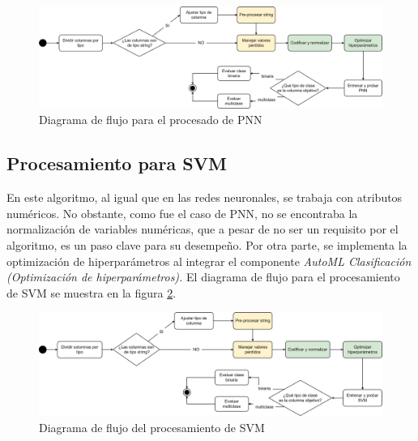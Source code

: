 \begin{figure}[H]
	\centering
	\includegraphics[width=1\linewidth]{"figuras/capi 2/modelos/procesado pnn.drawio"}
	\caption{Diagrama de flujo para el procesado de PNN}
	\label{fig:procesado-pnn}
\end{figure}


\subsection{Procesamiento para SVM}
En este algoritmo, al igual que en las redes neuronales, se trabaja con atributos numéricos. No obstante, como fue el caso de PNN, no se encontraba la normalización de variables numéricas, que a pesar de no ser un requisito por el algoritmo, es un paso clave para su desempeño. Por otra parte, se implementa la optimización de hiperparámetros al integrar el componente \textit{AutoML Clasificación (Optimización de hiperparámetros).} El diagrama de flujo para el procesamiento de SVM se muestra en la figura \ref{fig:procesado-svm}.

\begin{figure}[H]
	\centering
	\includegraphics[width=1\linewidth]{"figuras/capi 2/modelos/procesado svm.drawio"}
	\caption{Diagrama de flujo del procesamiento de SVM}
	\label{fig:procesado-svm}
\end{figure}


